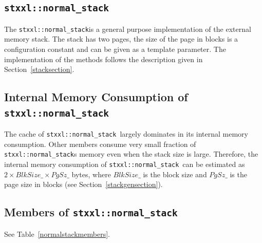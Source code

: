 \documentclass[twoside]{book}
\begin{document}
\newcommand{\xnormalstack}{\texttt{stxxl::normal\_stack}}
\subsection{\xnormalstack}
The \xnormalstack is a general purpose implementation of the external
memory stack. The stack has two pages, the size of the page in blocks
is a configuration constant and can be given as a template
parameter. The implementation of the methods follows the description
given in Section~\ref{stacksection}.

\subsection*{Internal Memory Consumption of \xnormalstack}
The cache of \xnormalstack\ largely dominates in its internal memory
consumption. Other members consume very small fraction of
\xnormalstack s 
memory even when the stack size is large. Therefore, the internal
memory consumption of \xnormalstack\ can be estimated as
$2 \times BlkSize\_ \times PgSz\_$ bytes, where $BlkSize\_$ is the
block size and $PgSz\_$ is the page size in blocks (see
Section~\ref{stackgensection}). 

\subsection*{Members of \xnormalstack}
See Table~\ref{normalstackmembers}.
\end{document}
